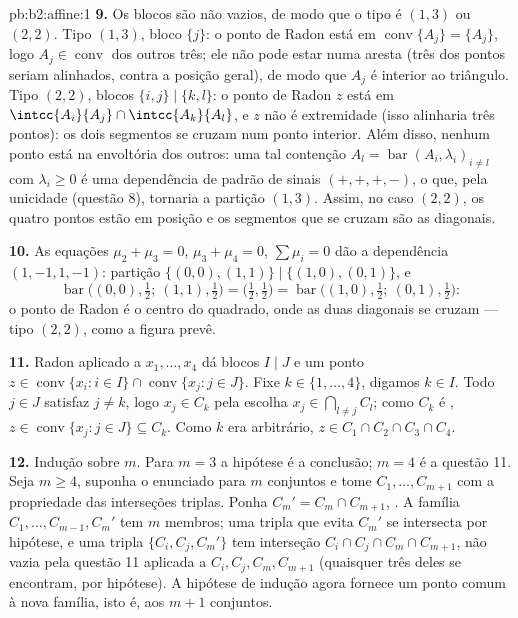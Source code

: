 \begin{solution}{pb:b2:affine:1}
\textbf{9.} Os blocos são não vazios, de modo que o tipo é $(1,3)$ ou
$(2,2)$. Tipo $(1,3)$, bloco $\{j\}$: o ponto de Radon está em
$\operatorname{conv}\{A_j\} = \{A_j\}$, logo $A_j \in
\operatorname{conv}$ dos outros três; ele não pode estar numa
aresta (três dos pontos seriam alinhados, contra a posição
geral), de modo que $A_j$ é interior ao triângulo. Tipo
$(2,2)$, blocos $\{i,j\} \mid \{k,l\}$: o ponto de Radon $z$
está em $\intcc{A_i}{A_j} \cap \intcc{A_k}{A_l}$, e $z$ não é
extremidade (isso alinharia três pontos): os dois
segmentos se cruzam num ponto interior. Além disso, nenhum ponto está
na envoltória dos outros: uma tal contenção $A_l =
\operatorname{bar}(A_i, \lambda_i)_{i \neq l}$ com
$\lambda_i \geq 0$ é uma dependência  de padrão de sinais
$(+,+,+,-)$, o que, pela unicidade (questão 8), tornaria a
partição $(1,3)$. Assim, no caso $(2,2)$, os quatro pontos estão
em posição  e os segmentos que se cruzam são as
diagonais.

\textbf{10.} As equações $\mu_2 + \mu_3 = 0$, $\mu_3 +
\mu_4 = 0$, $\sum\mu_i = 0$ dão a dependência $(1, -1, 1,
-1)$: partição $\{(0,0), (1,1)\} \mid \{(1,0), (0,1)\}$, e
\[
\operatorname{bar}\bigl((0,0), \tfrac12;\ (1,1),
\tfrac12\bigr) = \bigl(\tfrac12, \tfrac12\bigr) =
\operatorname{bar}\bigl((1,0), \tfrac12;\ (0,1),
\tfrac12\bigr) :
\]
o ponto de Radon é o centro do quadrado, onde as duas
diagonais se cruzam --- tipo $(2,2)$, como a figura prevê.

\textbf{11.} Radon aplicado a $x_1, \dots, x_4$ dá blocos
$I \mid J$ e um ponto $z \in \operatorname{conv}\{x_i : i
\in I\} \cap \operatorname{conv}\{x_j : j \in J\}$. Fixe $k
\in \{1, \dots, 4\}$, digamos $k \in I$. Todo $j \in J$
satisfaz $j \neq k$, logo $x_j \in C_k$ pela escolha $x_j \in
\bigcap_{l \neq j}C_l$; como $C_k$ é , $z \in
\operatorname{conv}\{x_j : j \in J\} \subseteq C_k$. Como $k$
era arbitrário, $z \in C_1 \cap C_2 \cap C_3 \cap C_4$.

\textbf{12.} Indução sobre $m$. Para $m = 3$ a hipótese é
a conclusão; $m = 4$ é a questão 11. Seja $m \geq 4$,
suponha o enunciado para $m$ conjuntos e tome $C_1, \dots,
C_{m+1}$ com a propriedade das interseções triplas. Ponha $C_m' =
C_m \cap C_{m+1}$, . A família $C_1, \dots, C_{m-1},
C_m'$ tem $m$ membros; uma tripla que evita $C_m'$ se intersecta por
hipótese, e uma tripla $\{C_i, C_j, C_m'\}$ tem
interseção $C_i \cap C_j \cap C_m \cap C_{m+1}$, não vazia
pela questão 11 aplicada a $C_i, C_j, C_m, C_{m+1}$ (quaisquer três
deles se encontram, por hipótese). A hipótese de indução agora
fornece um ponto comum à nova família, isto é, aos $m+1$
conjuntos.


\end{solution}
